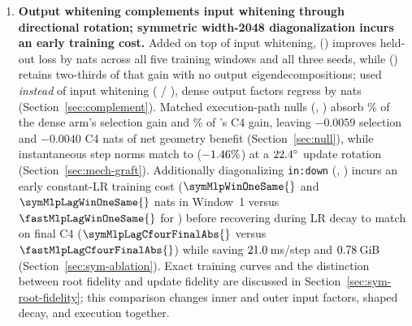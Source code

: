 \begin{enumerate}
\item \textbf{Output whitening complements input whitening through directional
  rotation; symmetric width-2048 diagonalization incurs an early training cost.}
  Added on top of input whitening,  (\mlpdiag{}) improves held-out
  loss by \mlpdiagselmag{} nats across all five training windows and all three
  seeds, while  (\alldiag{}) retains two-thirds of that gain with
  no output eigendecompositions; used \emph{instead} of input whitening
  ( / \leftall{}), dense output factors regress by
  \leftallsel{} nats (Section~\ref{sec:complement}). Matched execution-path
  nulls (, ) absorb \nullsharedense\% of the
  dense arm's selection gain and \nullsharemlpcfour\% of 's C4
  gain, leaving $-0.0059$ selection and $-0.0040$ C4 nats of net geometry
  benefit (Section~\ref{sec:null}), while instantaneous step norms match
   to \mechMlpdiagGraftNorm{} ($-1.46\%$) at a
  $22.4^\circ$ update rotation (Section~\ref{sec:mech-graft}).
  Additionally diagonalizing \texttt{in:down} (,
  ) incurs an early constant-LR training cost
  ($\symMlpWinOneSame{}$ and $\symMlpLagWinOneSame{}$ nats in Window~1 versus
  $\fastMlpLagWinOneSame{}$ for ) before recovering during LR
  decay to match  on final C4 ($\symMlpLagCfourFinalAbs{}$
  versus $\fastMlpLagCfourFinalAbs{}$) while saving $21.0$\,ms/step
  and $0.78$\,GiB (Section~\ref{sec:sym-ablation}).
  Exact training curves and the distinction between root fidelity and update
  fidelity are discussed in Section~\ref{sec:sym-root-fidelity}; this comparison
  changes inner and outer input factors, shaped decay, and execution together.


\end{enumerate}
